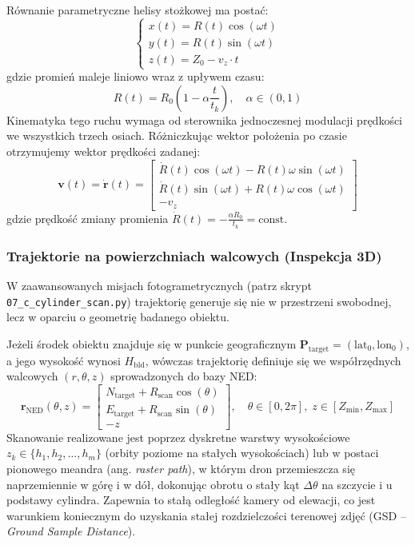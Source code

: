 Równanie parametryczne helisy stożkowej ma postać:
\begin{equation}
    \begin{cases}
        x(t) = R(t) \cos(\omega t) \\
        y(t) = R(t) \sin(\omega t) \\
        z(t) = Z_0 - v_z \cdot t
    \end{cases}
\end{equation}
gdzie promień maleje liniowo wraz z upływem czasu:
\begin{equation}
    R(t) = R_0 \left(1 - \alpha \frac{t}{t_k}\right), \quad \alpha \in (0, 1)
\end{equation}
Kinematyka tego ruchu wymaga od sterownika jednoczesnej modulacji prędkości we wszystkich trzech osiach. Różniczkując wektor położenia po czasie otrzymujemy wektor prędkości zadanej:
\begin{equation}
    \mathbf{v}(t) = \mathbf{\dot{r}}(t) = \begin{bmatrix}
        \dot{R}(t)\cos(\omega t) - R(t)\omega\sin(\omega t) \\
        \dot{R}(t)\sin(\omega t) + R(t)\omega\cos(\omega t) \\
        -v_z
    \end{bmatrix}
\end{equation}
gdzie prędkość zmiany promienia $\dot{R}(t) = -\frac{\alpha R_0}{t_k} = \text{const}$. 

\subsubsection{Trajektorie na powierzchniach walcowych (Inspekcja 3D)}
W zaawansowanych misjach fotogrametrycznych (patrz skrypt \texttt{07\_c\_cylinder\_scan.py}) trajektorię generuje się nie w przestrzeni swobodnej, lecz w oparciu o geometrię badanego obiektu. 

Jeżeli środek obiektu znajduje się w punkcie geograficznym $\mathbf{P}_{\text{target}} = (\text{lat}_0, \text{lon}_0)$, a jego wysokość wynosi $H_{\text{bld}}$, wówczas trajektorię definiuje się we współrzędnych walcowych $(r, \theta, z)$ sprowadzonych do bazy NED:
\begin{equation}
    \mathbf{r}_{\text{NED}}(\theta, z) = \begin{bmatrix}
        N_{\text{target}} + R_{\text{scan}} \cos(\theta) \\
        E_{\text{target}} + R_{\text{scan}} \sin(\theta) \\
        -z
    \end{bmatrix}, \quad \theta \in [0, 2\pi], \; z \in [Z_{\min}, Z_{\max}]
\end{equation}
Skanowanie realizowane jest poprzez dyskretne warstwy wysokościowe $z_k \in \{h_1, h_2, \dots, h_m\}$ (orbity poziome na stałych wysokościach) lub w postaci pionowego meandra (ang. \textit{raster path}), w którym dron przemieszcza się naprzemiennie w górę i w dół, dokonując obrotu o stały kąt $\Delta\theta$ na szczycie i u podstawy cylindra. Zapewnia to stałą odległość kamery od elewacji, co jest warunkiem koniecznym do uzyskania stałej rozdzielczości terenowej zdjęć (GSD -- \textit{Ground Sample Distance}).


